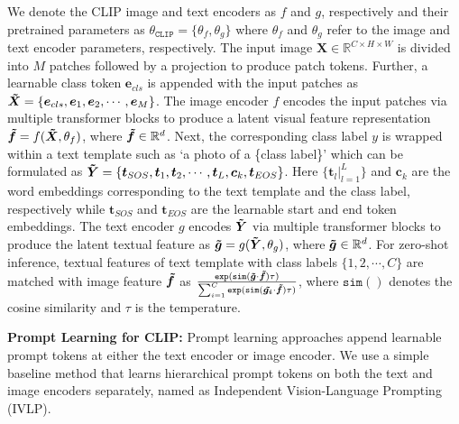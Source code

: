 \documentclass[10pt,twocolumn,letterpaper]{article}
\begin{document}
We denote the CLIP image and text encoders as ${f}$ and ${g}$, respectively and their pretrained parameters as ${\theta}_{\mathtt{CLIP}} = \{\theta_{f}, \theta_{g} \}$ where $\theta_{f}$ and $\theta_{g}$ refer to the image and text encoder parameters, respectively. The input image $\bm{X} \in \mathbb{R}^{C\times H\times W}$ is divided into $M$ patches followed by a projection to produce patch tokens.  Further, a learnable class token $\bm{e}_{cls}$ is appended with the input patches as $\bm{\Tilde{X}}= \{\bm{e}_{cls}, \bm{e}_{1}, \bm{e}_{2}, \cdots, \bm{e}_{M}\}$.
The image encoder ${f}$ encodes the input patches via multiple transformer blocks to produce a latent visual feature representation $\bm{\Tilde{f}} = f(\bm{\Tilde{X}}, \theta_{f})$, where $\bm{\Tilde{f}} \in  \mathbb{R}^{d}$. Next, the corresponding class label ${y}$ is wrapped within a text template such as ‘a photo of a \{class label\}’ which can be formulated as $\bm{\Tilde{Y}}=\{\bm{t}_{SOS}, \bm{t}_{1}, \bm{t}_{2}, \cdots, \bm{t}_{L}, \bm{c}_{k}, \bm{t}_{EOS}\}$. Here $\{\bm{t}_l|_{l=1}^{L}\}$ and $\bm{c}_{k}$ are the word embeddings corresponding to the text template and the class label, respectively while $\bm{t}_{SOS}$  and  $\bm{t}_{EOS}$ are the learnable start and end token embeddings. The text encoder ${g}$ encodes $\bm{\Tilde{Y}}$ via multiple transformer blocks to produce the latent textual feature as $\bm{\Tilde{g}} = g(\bm{\Tilde{Y}}, \theta_{g})$, where $\bm{\Tilde{g}} \in  \mathbb{R}^{d}$. For zero-shot inference, textual features of text template with class labels $\{1, 2, \cdots, C\}$
are matched with image feature $\bm{\Tilde{f}}$ as $\frac{\mathtt{exp}(\mathtt{sim}(\bm{\Tilde{g}} \cdot \bm{\Tilde{f}})\tau)}{\sum_{i=1}^{C}\mathtt{exp}(\mathtt{sim}(\bm{\Tilde{g_i}} \cdot \bm{\Tilde{f}})\tau)}$, where $\mathtt{sim}()$ denotes the cosine similarity and $\tau$ is the temperature.


\noindent \textbf{Prompt Learning for CLIP:} Prompt learning approaches append learnable prompt tokens at either the text \cite{zhou2022learning, zhou2022conditional} encoder or image \cite{bahng2022visual} encoder. We use a simple baseline method \cite{rasheed2023fine} that learns hierarchical prompt tokens on both the text and image encoders separately, named as Independent Vision-Language Prompting (IVLP).
\end{document}
